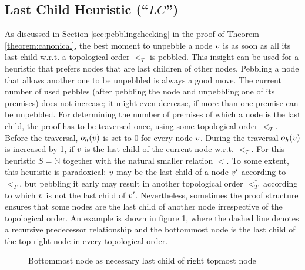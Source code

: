 \documentclass{llncs}
\begin{document}
\subsection{Last Child Heuristic (``$LC$'')}
\label{sec:lastchild}

As discussed in Section \ref{sec:pebblingchecking} in the proof of Theorem \ref{theorem:canonical}, the best moment to unpebble a node $v$ is as soon as all its last child w.r.t. a topological order $<_T$ is pebbled. 
This insight can be used for a heuristic that prefers nodes that are last children of other nodes. Pebbling a node that allows another one to be unpebbled is always a good move. 
The current number of used pebbles (after pebbling the node and unpebbling one of its premises) does not increase; 
it might even decrease, if more than one premise can be unpebbled.
For determining the number of premises of which a node is the last child, the proof has to be traversed once, using some topological order $<_T$.
Before the traversal, $o_h(v)$ is set to 0 for every node $v$. During the traversal $o_h(v)$ is increased by 1, if $v$ is the last child of the current node w.r.t. $<_T$. For this heuristic $S = \mathbb{N}$ together with the natural smaller relation $<$.
To some extent, this heuristic is paradoxical: $v$ may be the last child of a node $v'$ according to $<_T$, but pebbling it early may result in another topological order $<^*_T$ according to which $v$ is not the last child of $v'$.
Nevertheless, sometimes the proof structure ensures that some nodes are the last child of another node irrespective of the topological order. An example is shown in figure \ref{fig:forcedLC}, where the dashed line denotes a recursive predecessor relationship and the bottommost node is the last child of the top right node in every topological order.

\begin{figure}[h]
	\caption{Bottommost node as necessary last child of right topmost node}
	\label{fig:forcedLC}
\end{figure}
\end{document}
